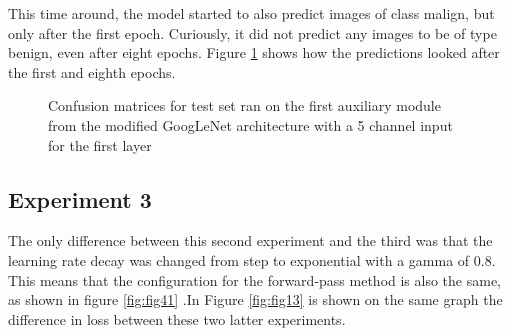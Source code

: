 This time around, the model started to also predict images of class malign, but only after the first epoch. Curiously, it did not predict any images to be of type benign, even after eight epochs. Figure \ref{fig:fig11} shows how the predictions looked after the first and eighth epochs.

\begin{figure}[!ht]
    \caption{Confusion matrices for test set ran on the first auxiliary module from the modified GoogLeNet architecture with a 5 channel input for the first layer}
    \label{fig:fig11}
\end{figure}

\subsection{Experiment 3}

The only difference between this second experiment and the third was that the learning rate decay was changed from step to exponential with a gamma of 0.8. This means that the configuration for the forward-pass method is also the same, as shown in figure \ref{fig:fig41} .In Figure \ref{fig:fig13} is shown on the same graph the difference in loss between these two latter experiments.

